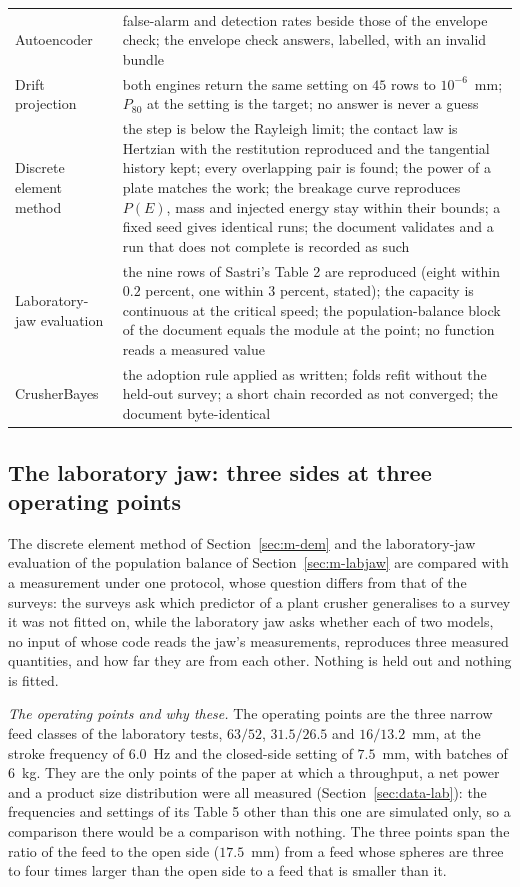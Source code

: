 \begin{table}[!t]
\begin{tabular}{@{}p{} p{}@{}}
Autoencoder & false-alarm and detection rates beside those of the envelope check; the envelope check answers, labelled, with an invalid bundle \\
Drift projection & both engines return the same setting on $45$ rows to $10^{-6}$~mm; $P_{80}$ at the setting is the target; no answer is never a guess \\
Discrete element method & the step is below the Rayleigh limit; the contact law is Hertzian with the restitution reproduced and the tangential history kept; every overlapping pair is found; the power of a plate matches the work; the breakage curve reproduces $P(E)$, mass and injected energy stay within their bounds; a fixed seed gives identical runs; the document validates and a run that does not complete is recorded as such \\
Laboratory-jaw evaluation & the nine rows of Sastri's Table 2 are reproduced (eight within $0.2$ percent, one within $3$ percent, stated); the capacity is continuous at the critical speed; the population-balance block of the document equals the module at the point; no function reads a measured value \\
CrusherBayes & the adoption rule applied as written; folds refit without the held-out survey; a short chain recorded as not converged; the document byte-identical \\
\bottomrule
\end{tabular}
\end{table}

\subsection{The laboratory jaw: three sides at three operating points}\label{sec:protocol-dem}

The discrete element method of Section~\ref{sec:m-dem} and the laboratory-jaw evaluation of the population balance of Section~\ref{sec:m-labjaw} are compared with a measurement under one protocol, whose question differs from that of the surveys: the surveys ask which predictor of a plant crusher generalises to a survey it was not fitted on, while the laboratory jaw asks whether each of two models, no input of whose code reads the jaw's measurements, reproduces three measured quantities, and how far they are from each other. Nothing is held out and nothing is fitted.

\emph{The operating points and why these.} The operating points are the three narrow feed classes of the laboratory tests, $63/52$, $31.5/26.5$ and $16/13.2$~mm, at the stroke frequency of $6.0$~Hz and the closed-side setting of $7.5$~mm, with batches of $6$~kg. They are the only points of the paper at which a throughput, a net power and a product size distribution were all measured (Section~\ref{sec:data-lab}): the frequencies and settings of its Table 5 other than this one are simulated only, so a comparison there would be a comparison with nothing. The three points span the ratio of the feed to the open side ($17.5$~mm) from a feed whose spheres are three to four times larger than the open side to a feed that is smaller than it.

